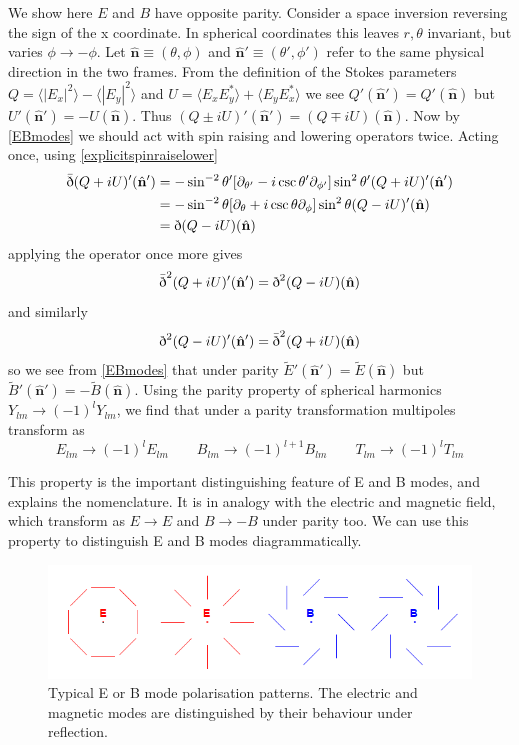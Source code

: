 \documentclass[a4paper,10pt]{article}
\renewcommand{\v}[1]{\mathbf{#1}}
\newcommand{\unit}[1]{\hat{\v{#1}}}
\newcommand{\sr}{\text{\normalfont\dh}}
\renewcommand{\sl}{\bar{\text{\normalfont\dh}}}
\begin{document}
We show here $E$ and $B$ have opposite parity. Consider a space inversion reversing the sign of the x coordinate. In spherical coordinates this leaves $r, \theta$ invariant, but varies $\phi \rightarrow -\phi$.  Let $\unit{n}\equiv(\theta, \phi)$ and $\unit{n}'\equiv(\theta', \phi')$ refer to the same physical direction in the two frames. From the definition of the Stokes parameters $Q=\langle |E_x|^2 \rangle - \langle |E_y|^2 \rangle$ and $U = \langle E_xE_y^* \rangle + \langle E_yE_x^* \rangle$ we see $Q'(\unit{n}') = Q'(\unit{n})$ but $U'(\unit{n}') = -U(\unit{n})$. Thus $(Q\pm iU)'(\unit{n}') = (Q\mp iU)(\unit{n})$. Now by \ref{EBmodes} we should act with spin raising and lowering operators twice. Acting once, using \ref{explicitspinraiselower}
\begin{equation}\begin{split}
\sl(Q+iU)'(\unit{n}') &= -\sin^{-2}{\theta'}[\partial_{\theta'}-i\csc{\theta'}\partial_{\phi'}]\sin^{2}{\theta'}(Q+iU)'(\unit{n}')\\
&= -\sin^{-2}{\theta}[\partial_{\theta}+i\csc{\theta}\partial_{\phi}]\sin^{2}{\theta}(Q-iU)'(\unit{n})\\
&= \sr (Q-iU)(\unit{n})
\end{split}\end{equation}
applying the operator once more gives
\begin{equation}
\sl^2(Q+iU)'(\unit{n}') = \sr^2 (Q-iU)(\unit{n})
\end{equation}
and similarly
\begin{equation}
\sr^2(Q-iU)'(\unit{n}') = \sl^2 (Q+iU)(\unit{n})
\end{equation}
so we see from \ref{EBmodes} that under parity $\tilde{E}'(\unit{n}')=\tilde{E}(\unit{n})$ but $\tilde{B}'(\unit{n}')=-\tilde{B}(\unit{n})$. Using the parity property of spherical harmonics $Y_{lm}\rightarrow(-1)^lY_{lm}$, we find that under a parity transformation multipoles transform as
\begin{equation}
E_{lm} \rightarrow (-1)^lE_{lm} \qquad B_{lm} \rightarrow (-1)^{l+1}B_{lm} \qquad T_{lm} \rightarrow (-1)^lT_{lm}
\end{equation} 

This property is the important distinguishing feature of E and B modes, and explains the nomenclature. It is in analogy with the electric and magnetic field, which transform as $E\rightarrow E$ and $B\rightarrow -B$ under parity too. We can use this property to distinguish E and B modes diagrammatically.

\begin{figure}[h]
  \includegraphics[width=\linewidth]{EBpicture.png}
  \caption{Typical E or B mode polarisation patterns. The electric and magnetic modes are distinguished by their behaviour under reflection.}
\end{figure}
\end{document}
